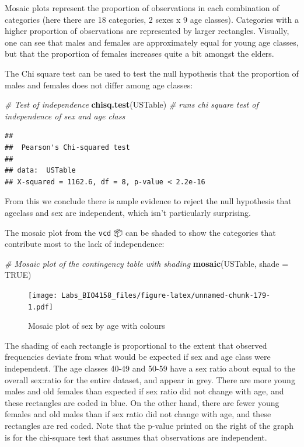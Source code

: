 \documentclass[
  12pt,
]{book}
\newenvironment{Shaded}{\begin{snugshade}}{\end{snugshade}}
\newcommand{\CommentTok}[1]{\textcolor[rgb]{0.56,0.35,0.01}{\textit{#1}}}
\newcommand{\DataTypeTok}[1]{\textcolor[rgb]{0.13,0.29,0.53}{#1}}
\newcommand{\KeywordTok}[1]{\textcolor[rgb]{0.13,0.29,0.53}{\textbf{#1}}}
\newcommand{\NormalTok}[1]{#1}
\newcommand{\OtherTok}[1]{\textcolor[rgb]{0.56,0.35,0.01}{#1}}
\begin{document}
Mosaic plots represent the proportion of observations in each combination of categories (here there are 18 categories, 2 sexes x 9 age classes). Categories with a higher proportion of observations are represented by larger rectangles. Visually, one can see that males and females are approximately equal for young age classes, but that the proportion of females increases quite a bit amongst the elders.

The Chi square test can be used to test the null hypothesis that the proportion of males and females does not differ among age classes:

\begin{Shaded}
\begin{Highlighting}[]
\CommentTok{\# Test of independence}
\KeywordTok{chisq.test}\NormalTok{(USTable) }\CommentTok{\# runs chi square test of independence of sex and age class}
\end{Highlighting}
\end{Shaded}

\begin{verbatim}
## 
##  Pearson's Chi-squared test
## 
## data:  USTable
## X-squared = 1162.6, df = 8, p-value < 2.2e-16
\end{verbatim}

From this we conclude there is ample evidence to reject the null hypothesis that ageclass and sex are independent, which isn't particularly surprising.

The mosaic plot from the \texttt{vcd} 📦 can be shaded to show the categories that contribute most to the lack of independence:

\begin{Shaded}
\begin{Highlighting}[]
\CommentTok{\# Mosaic plot of the contingency table with shading}
\KeywordTok{mosaic}\NormalTok{(USTable, }\DataTypeTok{shade =} \OtherTok{TRUE}\NormalTok{)}
\end{Highlighting}
\end{Shaded}

\begin{figure}
\centering
\texttt{[image: Labs\_BIO4158\_files/figure-latex/unnamed-chunk-179-1.pdf]}
\caption{\label{fig:unnamed-chunk-179}Mosaic plot of sex by age with colours}
\end{figure}

The shading of each rectangle is proportional to the extent that observed frequencies deviate from what would be expected if sex and age class were independent. The age classes 40-49 and 50-59 have a sex ratio about equal to the overall sex:ratio for the entire dataset, and appear in grey. There are more young males and old females than expected if sex ratio did not change with age, and these rectangles are coded in blue. On the other hand, there are fewer young females and old males than if sex ratio did not change with age, and these rectangles are red coded. Note that the p-value printed on the right of the graph is for the chi-square test that assumes that observations are independent.
\end{document}
